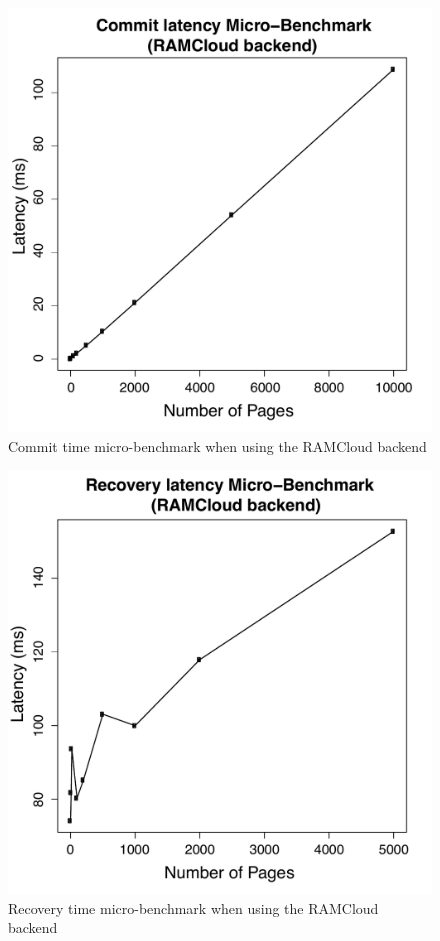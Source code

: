 \begin{figure}[t!]
\begin{center}
\includegraphics[scale=0.40]{graphs/commit_time_rc_latencies.pdf}
\end{center}
\caption{Commit time micro-benchmark when using the RAMCloud backend}
\label{fig:rc-commit-ubm}
\end{figure}

\begin{figure}[t!]
\begin{center}
\includegraphics[scale=0.40]{graphs/recovery_time_rc_latencies.pdf}
\end{center}
\caption{Recovery time micro-benchmark when using the RAMCloud backend}
\label{fig:rc-recovery-ubm}
\end{figure}


